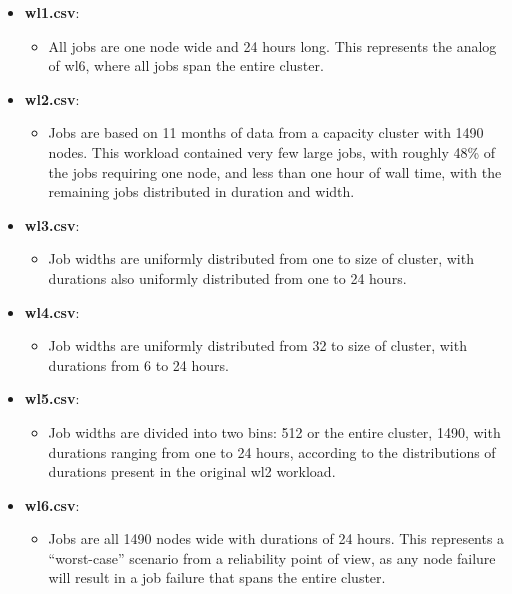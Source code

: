 \documentclass[titlepage]{article}
\begin{document}
\begin{itemize}
  \item \textbf{wl1.csv}:
  \begin{itemize}
    \item All jobs are one node wide and 24 hours long. This
			represents the analog of wl6, where all jobs span the
			entire cluster. 
  \end{itemize}
  \item \textbf{wl2.csv}:
  \begin{itemize}
    \item Jobs are based on 11 months of data from a capacity
			cluster with 1490 nodes. This workload contained
			very few large jobs, with roughly 48\% of the jobs
			requiring one node, and less than one hour of wall
			time, with the remaining jobs distributed in duration
			and width.
  \end{itemize}
  \item \textbf{wl3.csv}:
  \begin{itemize}
    \item Job widths are uniformly distributed from one to size
			of cluster, with durations also uniformly distributed
			from one to 24 hours.
  \end{itemize}
  \item \textbf{wl4.csv}:
  \begin{itemize}
    \item Job widths are uniformly distributed from 32 to size
			of cluster, with durations from 6 to 24 hours.
  \end{itemize}
  \item \textbf{wl5.csv}:
  \begin{itemize}
    \item Job widths are divided into two bins: 512 or the
			entire cluster, 1490, with durations ranging from one
			to 24 hours, according to the distributions of durations
			present in the original wl2 workload.
  \end{itemize}
  \item \textbf{wl6.csv}:
  \begin{itemize}
    \item Jobs are all 1490 nodes wide with durations of 24
			hours. This represents a “worst-case” scenario from a
			reliability point of view, as any node failure will result
			in a job failure that spans the entire cluster.
  \end{itemize}
\end{itemize}
\end{document}
